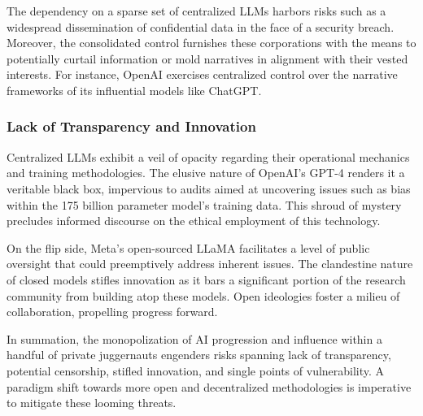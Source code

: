 The dependency on a sparse set of centralized LLMs harbors risks such as a widespread dissemination of confidential data in the face of a security breach. Moreover, the consolidated control furnishes these corporations with the means to potentially curtail information or mold narratives in alignment with their vested interests. For instance, OpenAI exercises centralized control over the narrative frameworks of its influential models like ChatGPT.

\subsubsection{Lack of Transparency and Innovation}

Centralized LLMs exhibit a veil of opacity regarding their operational mechanics and training methodologies. The elusive nature of OpenAI's GPT-4 renders it a veritable black box, impervious to audits aimed at uncovering issues such as bias within the 175 billion parameter model's training data. This shroud of mystery precludes informed discourse on the ethical employment of this technology.

On the flip side, Meta's open-sourced LLaMA facilitates a level of public oversight that could preemptively address inherent issues. The clandestine nature of closed models stifles innovation as it bars a significant portion of the research community from building atop these models. Open ideologies foster a milieu of collaboration, propelling progress forward.

In summation, the monopolization of AI progression and influence within a handful of private juggernauts engenders risks spanning lack of transparency, potential censorship, stifled innovation, and single points of vulnerability. A paradigm shift towards more open and decentralized methodologies is imperative to mitigate these looming threats.



